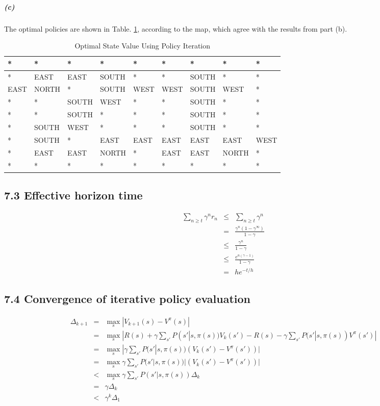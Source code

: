 \documentclass{article}
\begin{document}
\subparagraph*{(c)}
The optimal policies are shown in Table. \ref{policyiter}, according to the map, which agree with the results from part (b).
\begin{table}
	\centering
	\begin{tabular}{|p{1.5cm}|p{1.5cm}|p{1.5cm}|p{1.5cm}|p{1.5cm}|p{1.5cm}|p{1.5cm}|p{1.5cm}|p{1.5cm}|}
		\hline
		*  & *  & *  & *  & *  & *  & *  & *  & * \\
		\hline
		*  & EAST  & EAST  & SOUTH  & *  & *  & SOUTH  & *  & * \\
		\hline
		EAST  & NORTH  & *  & SOUTH  & WEST  & WEST  & SOUTH  & WEST  & * \\
		\hline
		*  & *  & SOUTH  & WEST  & *  & *  & SOUTH  & *  & * \\
		\hline
		*  & *  & SOUTH  & *  & *  & *  & SOUTH  & *  & * \\
		\hline
		*  & SOUTH  & WEST  & *  & *  & *  & SOUTH  & *  & * \\
		\hline
		*  & SOUTH  & *  & EAST  & EAST  & EAST  & EAST  & EAST  & WEST \\
		\hline
		*  & EAST  & EAST  & NORTH  & *  & EAST  & EAST  & NORTH  & * \\
		\hline
		*  & *  & *  & *  & *  & *  & *  & *  & * \\
		\hline
	\end{tabular}
	\caption{Optimal State Value Using Policy Iteration}
	\label{policyiter}
\end{table}

\subsection*{7.3 Effective horizon time}
\begin{eqnarray*}
	\sum_{n \ge t}\gamma^{n}r_n &\le& \sum_{n \ge t}\gamma^{n}\\
	&=& \frac{\gamma^n(1-\gamma^{\infty})}{1-\gamma}\\
	&\le& \frac{\gamma^n}{1-\gamma}\\
	&\le& \frac{e^{n(\gamma-1)}}{1-\gamma}\\
	&=& he^{-t/h}
\end{eqnarray*}

\subsection*{7.4 Convergence of iterative policy evaluation}
\begin{eqnarray*}
	\Delta_{k+1} &=& \max_s|V_{k+1}(s) - V^\pi(s)|\\
	&=& \max_s|R(s)+\gamma\sum_{s'}P(s'|s,\pi(s))V_k(s') - R(s) - \gamma\sum_{s'}P(s'|s,\pi(s))V^\pi(s')|\\
	&=& \max_s|\gamma\sum_{s'}P(s'|s,\pi(s))(V_k(s')-V^\pi(s'))|\\
	&=& \max_s \gamma\sum_{s'}P(s'|s,\pi(s))|(V_k(s')-V^\pi(s'))|\\
	&<& \max_s \gamma\sum_{s'}P(s'|s,\pi(s))\Delta_k\\
	&=& \gamma \Delta_k \\
	&<& \gamma^k \Delta_1
\end{eqnarray*}
\end{document}
